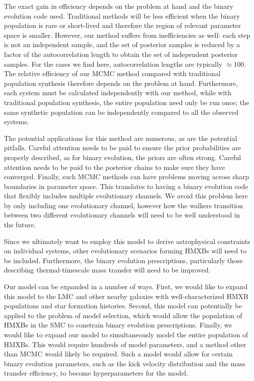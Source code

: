 \documentclass[12pt, preprint]{aastex}
\begin{document}
The exact gain in efficiency depends on the problem at hand and the binary evolution code used. Traditional methods will be less efficient when the binary population is rare or short-lived and therefore the region of relevant parameter space is smaller. However, our method suffers from inefficiencies as well: each step is not an independent sample, and the set of posterior samples is reduced by a factor of the autocorrelation length to obtain the set of independent posterior samples. For the cases we find here, autocorrelation lengths are typically $\approx$100. The relative efficiency of our MCMC method compared with traditional population synthesis therefore depends on the problem at hand. Furthermore, each system must be calculated independently with our method, while with traditional population synthesis, the entire population need only be run once; the same synthetic population can be independently compared to all the observed systems.

The potential applications for this method are numerous, as are the potential pitfalls. Careful attention needs to be paid to ensure the prior probabilities are properly described, as for binary evolution, the priors are often strong. Careful attention needs to be paid to the posterior chains to make sure they have converged. Finally, such MCMC methods can have problems moving across sharp boundaries in parameter space. This translates to having a binary evolution code that flexibly includes multiple evolutionary channels. We avoid this problem here by only including one evolutionary channel, however how the walkers transition between two different evolutionary channels will need to be well understood in the future. 

Since we ultimately want to employ this model to derive astrophysical constraints on individual systems, other evolutionary scenarios forming HMXBs will need to be included. Furthermore, the binary evolution prescriptions, particularly those describing thermal-timescale mass transfer will need to be improved. 

Our model can be expanded in a number of ways. First, we would like to expand this model to the LMC and other nearby galaxies with well-characterized HMXB populations and star formation histories. Second, this model can potentially be applied to the problem of model selection, which would allow the population of HMXBs in the SMC to constrain binary evolution prescriptions. Finally, we would like to expand our model to simultaneously model the entire population of HMXBs. This would require hundreds of model parameters, and a method other than MCMC would likely be required. Such a model would allow for certain binary evolution parameters, such as the kick velocity distribution and the mass transfer efficiency, to become hyperparameters for the model. 
\end{document}
